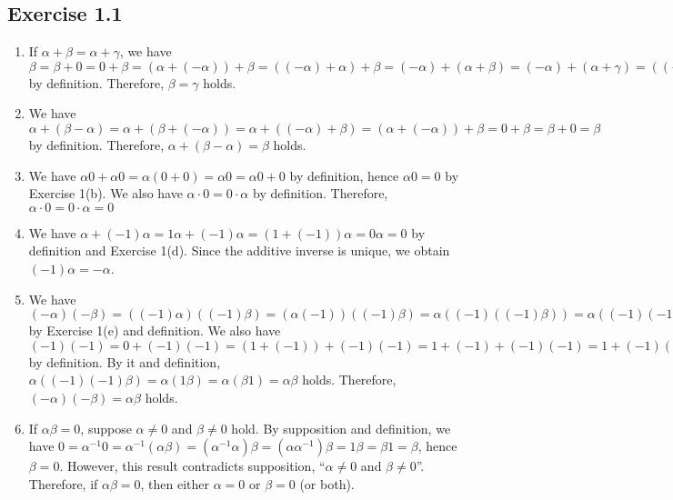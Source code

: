 \documentclass{article}
\begin{document}
\subsection{Exercise 1.1}
\begin{enumerate}[label = (\alph*), resume]
  \item If $\alpha + \beta = \alpha + \gamma$, 
    we have $\beta = \beta + 0 = 0 + \beta = (\alpha + (-\alpha)) + \beta = ((-\alpha) + \alpha) + \beta = (-\alpha) + (\alpha + \beta) = (-\alpha) + (\alpha + \gamma) = ((-\alpha) + \alpha) + \gamma = (\alpha + (-\alpha)) + \gamma = 0 + \gamma = \gamma + 0 = \gamma$ by definition.
    Therefore, $\beta = \gamma$ holds.

  \item We have $\alpha + (\beta - \alpha) = \alpha + (\beta + (-\alpha)) = \alpha + ((-\alpha) + \beta) = (\alpha + (-\alpha)) + \beta = 0 + \beta = \beta + 0 = \beta$ by definition.
    Therefore, $\alpha + (\beta - \alpha) = \beta$ holds.
    
  \item We have $\alpha0 + \alpha0 = \alpha(0 + 0) = \alpha0 = \alpha 0 + 0$ by definition,
    hence $\alpha0 = 0$ by Exercise 1(b).
    We also have $\alpha\cdot0 = 0\cdot\alpha$ by definition.
    Therefore, $\alpha\cdot0 = 0\cdot\alpha = 0$
    
  \item We have $\alpha + (-1)\alpha = 1\alpha + (-1)\alpha = (1 + (-1))\alpha = 0\alpha = 0$ by definition and Exercise 1(d).
      Since the additive inverse is unique,
      we obtain $(-1)\alpha = -\alpha$.
    
  \item We have $(-\alpha)(-\beta) = ((-1)\alpha)((-1)\beta) = (\alpha(-1))((-1)\beta) = \alpha((-1)((-1)\beta)) = \alpha((-1)(-1)\beta)$ by Exercise 1(e) and definition.
    We also have $(-1)(-1) = 0 + (-1)(-1) = (1 + (-1)) + (-1)(-1) = 1 + (-1) + (-1)(-1) = 1 + (-1)((-1) + 1) = 1 + (-1)(1 + (-1)) = 1 + (-1)0 = 1 + 0 = 1$ by definition.
    By it and definition, $\alpha((-1)(-1)\beta) = \alpha(1\beta) = \alpha(\beta1) = \alpha\beta$ holds.
    Therefore, $(-\alpha)(-\beta) = \alpha\beta$ holds.
    
  \item\label{it:ex1.1.g}
    If $\alpha\beta = 0$,
    suppose $\alpha \neq 0$ and $\beta \neq 0$ hold.
    By supposition and definition, we have $0 = \alpha^{-1}0 = \alpha^{-1}(\alpha\beta) = (\alpha^{-1}\alpha)\beta = (\alpha\alpha^{-1})\beta = 1\beta = \beta1 = \beta$,
    hence $\beta = 0$.
    However, this result contradicts supposition, ``$\alpha \neq 0$ and $\beta \neq 0$''.
    Therefore, if $\alpha\beta = 0$, then either $\alpha = 0$ or $\beta = 0$ (or both).
\end{enumerate}
\end{document}
